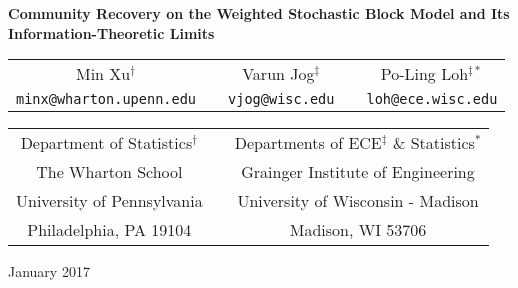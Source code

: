 \documentclass{article}
\begin{document}
\begin{center}
{\bf{\Large{Community Recovery on the Weighted Stochastic Block Model and Its Information-Theoretic Limits}}}

\vspace*{.25in}

\begin{tabular}{ccccc}
{\large{Min Xu$^\dagger$}} & \hspace*{.2in} & {\large{Varun Jog$^\ddagger$}} & \hspace*{.2in} & {\large{Po-Ling Loh$^{\ddagger*}$}} \\
{\large{\texttt{minx@wharton.upenn.edu}}} & & {\large{\texttt{vjog@wisc.edu}}} & & {\large{\texttt{loh@ece.wisc.edu}}}
\end{tabular}

\vspace{.2in}

\begin{tabular}{ccc}
Department of Statistics$^\dagger$ & \hspace{.3in} & Departments of ECE$^\ddagger$ \& Statistics$^*$ \\
The Wharton School && Grainger Institute of Engineering \\
University of Pennsylvania && University of Wisconsin - Madison \\ Philadelphia, PA 19104 & & Madison, WI 53706
\end{tabular}
 
\vspace*{.2in}

January 2017

\vspace*{.2in}

\end{center}





\vskip10pt





%


\newpage




\appendix


\end{document}
